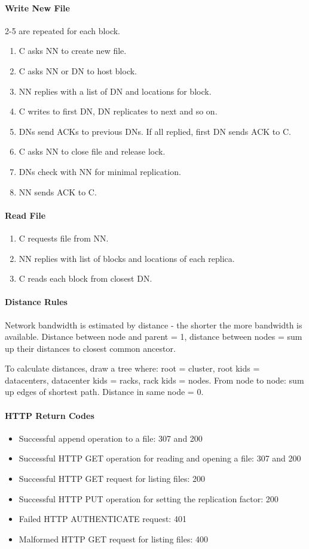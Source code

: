 \paragraph{Write New File}
2-5 are repeated for each block.
\begin{enumerate}
    \item C asks NN to create new file.
    \item C asks NN or DN to host block.
    \item NN replies with a list of DN and locations for block.
    \item C writes to first DN, DN replicates to next and so on.
    \item DNs send ACKs to previous DNs. If all replied, first DN sends ACK to C.
    \item C asks NN to close file and release lock.
    \item DNs check with NN for minimal replication.
    \item NN sends ACK to C.
\end{enumerate}

\paragraph{Read File}
\begin{enumerate}
    \item C requests file from NN.
    \item NN replies with list of blocks and locations of each replica.
    \item C reads each block from closest DN.
\end{enumerate}

\paragraph{Distance Rules}
Network bandwidth is estimated by distance - the shorter the more bandwidth is available. Distance between node and parent = 1, distance between nodes = sum up their distances to closest common ancestor.

To calculate distances, draw a tree where: root = cluster, root kids = datacenters, datacenter kids = racks, rack kids = nodes. From node to node: sum up edges of shortest path. Distance in same node = 0.

\paragraph{HTTP Return Codes}
\begin{itemize}
    \item Successful append operation to a file: 307 and 200
    \item Successful HTTP GET operation for reading and opening a file: 307 and 200
    \item Successful HTTP GET request for listing files: 200
    \item Successful HTTP PUT operation for setting the replication factor: 200
    \item Failed HTTP AUTHENTICATE request: 401
    \item Malformed HTTP GET request for listing files: 400
\end{itemize}

